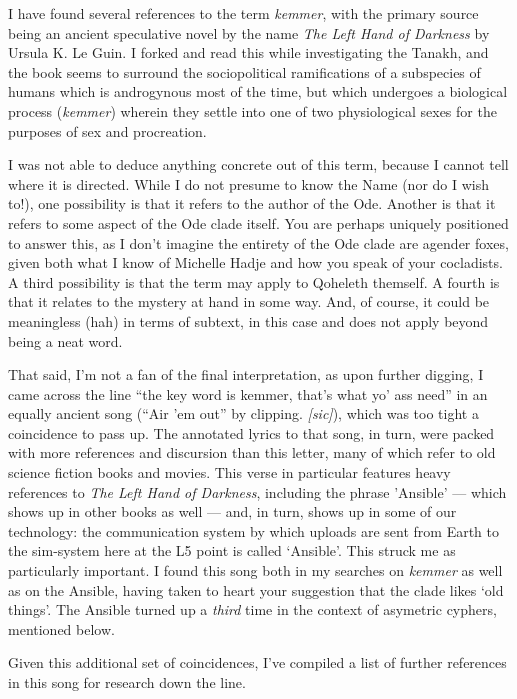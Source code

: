 I have found several references to the term \emph{kemmer}, with the primary source being an ancient speculative novel by the name \emph{The Left Hand of Darkness} by Ursula K. Le Guin. I forked and read this while investigating the Tanakh, and the book seems to surround the sociopolitical ramifications of a subspecies of humans which is androgynous most of the time, but which undergoes a biological process (\emph{kemmer}) wherein they settle into one of two physiological sexes for the purposes of sex and procreation.

I was not able to deduce anything concrete out of this term, because I cannot tell where it is directed. While I do not presume to know the Name (nor do I wish to!), one possibility is that it refers to the author of the Ode. Another is that it refers to some aspect of the Ode clade itself. You are perhaps uniquely positioned to answer this, as I don't imagine the entirety of the Ode clade are agender foxes, given both what I know of Michelle Hadje and how you speak of your cocladists. A third possibility is that the term may apply to Qoheleth themself. A fourth is that it relates to the mystery at hand in some way. And, of course, it could be meaningless (hah) in terms of subtext, in this case and does not apply beyond being a neat word.

That said, I'm not a fan of the final interpretation, as upon further digging, I came across the line ``the key word is kemmer, that's what yo' ass need'' in an equally ancient song (``Air 'em out'' by clipping. \emph{{[}sic{]}}), which was too tight a coincidence to pass up. The annotated lyrics to that song, in turn, were packed with more references and discursion than this letter, many of which refer to old science fiction books and movies. This verse in particular features heavy references to \emph{The Left Hand of Darkness}, including the phrase 'Ansible' — which shows up in other books as well — and, in turn, shows up in some of our technology: the communication system by which uploads are sent from Earth to the sim-system here at the L5 point is called `Ansible'. This struck me as particularly important. I found this song both in my searches on \emph{kemmer} as well as on the Ansible, having taken to heart your suggestion that the clade likes `old things'. The Ansible turned up a \emph{third} time in the context of asymetric cyphers, mentioned below.

Given this additional set of coincidences, I've compiled a list of further references in this song for research down the line.

